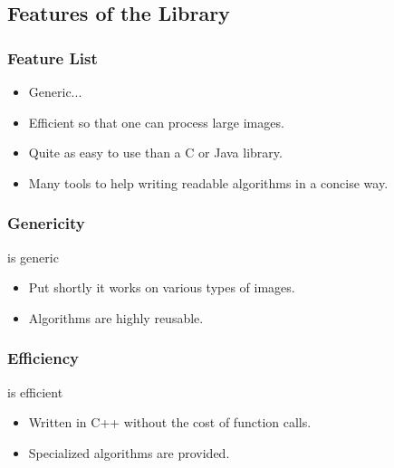 \documentclass{beamer}
\begin{document}
\subsection{Features of the \mln Library}

\begin{frame}
  \frametitle{Feature List}

  \begin{itemize}
  \item Generic...
  \item Efficient so that one can process large images.
  \item Quite as easy to use than a C or Java library.
  \item Many tools to help writing readable algorithms in a concise way.
  \end{itemize}

\end{frame}


\begin{frame}
  \frametitle{Genericity}

  \begin{block}{\mln is generic}
    \begin{itemize}
    \item Put shortly it works on various types of images.
    \item Algorithms are highly reusable.
    \end{itemize}
  \end{block}


\end{frame}


\begin{frame}
  \frametitle{Efficiency}

  \begin{block}{\mln is efficient}
    \begin{itemize}
    \item Written in C++ without the cost of function calls.
    \item Specialized algorithms are provided.
    \end{itemize}
  \end{block}


\end{frame}
\end{document}
